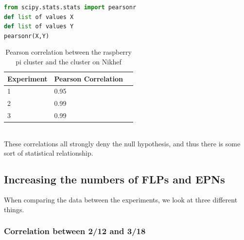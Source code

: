 \begin{lstlisting}[frame=single,language=Python,caption={Pearson correlation calculation in Python},label={lst:PearsonInPython}]
from scipy.stats.stats import pearsonr
def list of values X
def list of values Y
pearsonr(X,Y)
\end{lstlisting}

\begin{table}[h!]
\begin{tabular}{| l | l | l |}
\hline
Experiment & Pearson Correlation \\ \hline
1 & 0.95 \\ \hline
2 & 0.99 \\ \hline
3 & 0.99 \\ \hline
\end{tabular}
\caption{Pearson correlation between the raspberry pi cluster and the cluster on Nikhef}
\label{table:PearsonCor}
\end{table}

~\\ These correlations all strongly deny the null hypothesis, and thus there is some sort of statistical relationship. 
\subsection{Increasing the numbers of FLPs and EPNs}
When comparing the data between the experiments, we look at three different things.

\subsubsection*{Correlation between 2/12 and 3/18}
